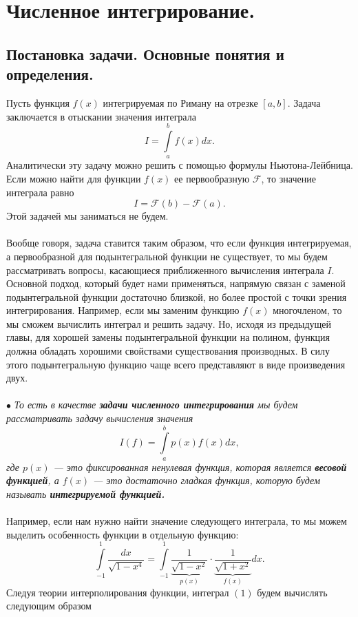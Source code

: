 \documentclass[a4paper, 12pt]{report}
\numberwithin{equation}{section}
\begin{document}
	 \chapter{Численное интегрирование.}
	 \section{Постановка задачи. Основные понятия и определения.}
	 Пусть функция $f(x)$ интегрируемая по Риману на отрезке $[a,b]$. Задача заключается в отыскании значения интеграла $$I = \int\limits_a^b f(x)dx.$$
	 Аналитически эту задачу можно решить с помощью формулы Ньютона-Лейбница. Если можно найти для функции $f(x)$ ее первообразную $\mathcal F$, то значение интеграла равно $$I = \mathcal F(b) - \mathcal F(a).$$ Этой задачей мы заниматься не будем.\\\\
	 Вообще говоря, задача ставится таким образом, что если функция интегрируемая, а первообразной для подынтегральной функции не существует, то мы будем рассматривать вопросы, касающиеся приближенного вычисления интеграла $I$. Основной подход, который будет нами применяться, напрямую связан с заменой подынтегральной функции достаточно близкой, но более простой с точки зрения интегрирования. Например, если мы заменим функцию $f(x)$ многочленом, то мы сможем вычислить интеграл и решить задачу. Но, исходя из предыдущей главы, для хорошей замены подынтегральной функции на полином, функция должна обладать хорошими свойствами существования производных. В силу этого подынтегральную функцию чаще всего представляют в виде произведения двух. 
	 \\\\
	 $\bullet$ \textit{То есть в качестве \textbf{задачи численного интегрирования} мы будем рассматривать задачу вычисления значения 
	 \begin{equation}
	 	I(f) = \int\limits_a^b p(x)f(x)dx,
	 \end{equation} где $p(x)$ --- это фиксированная ненулевая функция, которая является \textbf{весовой функцией}, а $f(x)$ --- это достаточно гладкая функция, которую будем называть \textbf{интегрируемой функцией.}} \\\\
	 Например, если нам нужно найти значение следующего интеграла, то мы можем выделить особенность функции в отдельную функцию: $$\int\limits_{-1}^1 \dfrac{dx}{\sqrt{1-x^4}} = \int\limits_{-1}^1 \underbrace{\dfrac{1}{\sqrt{1-x^2}}}_{p(x)}\cdot\underbrace{\dfrac{1}{\sqrt{1+x^2}}}_{f(x)}dx.$$
	 Следуя теории интерполирования функции, интеграл $(1)$ будем вычислять следующим образом 
\end{document}
